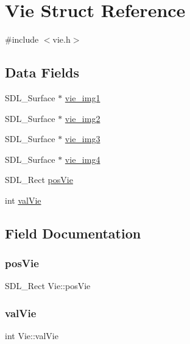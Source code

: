 \hypertarget{structVie}{}\section{Vie Struct Reference}
\label{structVie}


{\ttfamily \#include $<$vie.\+h$>$}

\subsection*{Data Fields}
\begin{DoxyCompactItemize}
\item 
S\+D\+L\+\_\+\+Surface $\ast$ \hyperlink{structVie_ab737dfbd09f4f094fee7e7182c2610f6}{vie\+\_\+img1}
\item 
S\+D\+L\+\_\+\+Surface $\ast$ \hyperlink{structVie_aaf9de52d2a9ecce1d95b3caaf0f1c144}{vie\+\_\+img2}
\item 
S\+D\+L\+\_\+\+Surface $\ast$ \hyperlink{structVie_a0e8a93a5738e5b1f6a1b4e847f6e039d}{vie\+\_\+img3}
\item 
S\+D\+L\+\_\+\+Surface $\ast$ \hyperlink{structVie_a03c03529f7221ba0e219e440fd44ca68}{vie\+\_\+img4}
\item 
S\+D\+L\+\_\+\+Rect \hyperlink{structVie_aac5227324a8cc878e4e2c3b128a12856}{pos\+Vie}
\item 
int \hyperlink{structVie_a108db214817c1a00c67457b644569671}{val\+Vie}
\end{DoxyCompactItemize}


\subsection{Field Documentation}
\mbox{\label{structVie_aac5227324a8cc878e4e2c3b128a12856}} 
\subsubsection{\texorpdfstring{pos\+Vie}{posVie}}
{\footnotesize\ttfamily S\+D\+L\+\_\+\+Rect Vie\+::pos\+Vie}

\mbox{\label{structVie_a108db214817c1a00c67457b644569671}} 
\subsubsection{\texorpdfstring{val\+Vie}{valVie}}
{\footnotesize\ttfamily int Vie\+::val\+Vie}

